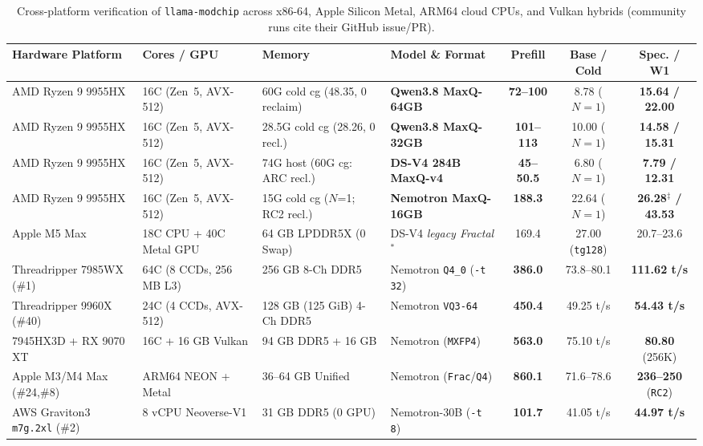 \documentclass[10pt,twocolumn]{article}
\begin{document}
\begin{table}[t]
\centering
\caption{Cross-platform verification of \texttt{llama-modchip} across x86-64, Apple Silicon Metal, ARM64 cloud CPUs, and Vulkan hybrids (community runs cite their GitHub issue/PR).}
\label{tab:platforms}
\scriptsize
\setlength{\tabcolsep}{2.6pt}
\begin{tabularx}{\textwidth}{@{}lLLlccc@{}}
\toprule
\textbf{Hardware Platform} & \textbf{Cores / GPU} & \textbf{Memory} & \textbf{Model \& Format} & \textbf{Prefill} & \textbf{Base / Cold} & \textbf{Spec. / W1} \\
\midrule
AMD Ryzen 9 9955HX & 16C (Zen~5, AVX-512) & 60G cold cg (48.35, 0 reclaim) & \textbf{Qwen3.8 MaxQ-64GB} & \textbf{72--100} & 8.78 ($N=1$) & \textbf{15.64 / 22.00} \\
AMD Ryzen 9 9955HX & 16C (Zen~5, AVX-512) & 28.5G cold cg (28.26, 0 recl.) & \textbf{Qwen3.8 MaxQ-32GB} & \textbf{101--113} & 10.00 ($N=1$) & \textbf{14.58 / 15.31} \\
AMD Ryzen 9 9955HX & 16C (Zen~5, AVX-512) & 74G host (60G cg: ARC recl.) & \textbf{DS-V4 284B MaxQ-v4} & \textbf{45--50.5} & 6.80 ($N=1$)\rlap{$^\S$} & \textbf{7.79 / 12.31}\rlap{$^\S$} \\
AMD Ryzen 9 9955HX & 16C (Zen~5, AVX-512) & 15G cold cg ($N$=1; RC2 recl.) & \textbf{Nemotron MaxQ-16GB} & \textbf{188.3}\rlap{$^\parallel$} & 22.64 ($N=1$) & \textbf{26.28$^\ddagger$ / 43.53}\rlap{$^\parallel$} \\
Apple M5 Max & 18C CPU + 40C Metal GPU & 64 GB LPDDR5X (0 Swap) & DS-V4 \textit{legacy Fractal}$^*$ & 169.4 & 27.00 (\texttt{tg128}) & 20.7--23.6 \\
Threadripper 7985WX (\#1) & 64C (8 CCDs, 256 MB L3) & 256 GB 8-Ch DDR5 & Nemotron \texttt{Q4\_0} (\texttt{-t 32}) & \textbf{386.0} & 73.8--80.1 & \textbf{111.62 t/s} \\
Threadripper 9960X (\#40) & 24C (4 CCDs, AVX-512) & 128 GB (125 GiB) 4-Ch DDR5 & Nemotron \texttt{VQ3-64} & \textbf{450.4} & 49.25 t/s & \textbf{54.43 t/s} \\
7945HX3D + RX 9070 XT & 16C + 16 GB Vulkan & 94 GB DDR5 + 16 GB & Nemotron (\texttt{MXFP4}) & \textbf{563.0} & 75.10 t/s & \textbf{80.80} (256K) \\
Apple M3/M4 Max (\#24,\#8) & ARM64 NEON + Metal & 36--64 GB Unified & Nemotron (\texttt{Frac}/\texttt{Q4}) & \textbf{860.1} & 71.6--78.6 & \textbf{236--250} (\texttt{RC2}) \\
AWS Graviton3 \texttt{m7g.2xl} (\#2) & 8 vCPU Neoverse-V1 & 31 GB DDR5 (0 GPU) & Nemotron-30B (\texttt{-t 8}) & \textbf{101.7} & 41.05 t/s & \textbf{44.97 t/s} \\

\end{tabularx}
\end{table}
\end{document}
